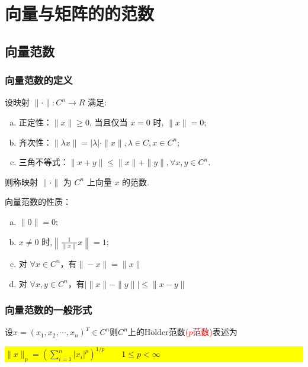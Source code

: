 \section{向量与矩阵的的范数}
\subsection{向量范数}
 \subsubsection{向量范数的定义}

\begin{definition}
设映射 \( \|\cdot\|: C^{n} \rightarrow R \) 满足:
\begin{enumerate}[(a)]
	\item 正定性：\( \|x\| \geq 0 \), 当且仅当 \( x=0 \) 时, \( \|x\|=0 \);
	\item 齐次性：\( \|\lambda x\|=|\lambda| \cdot\|x\|, \lambda \in C, x \in C^{n} \);
	\item 三角不等式：\( \|x+y\| \leq\|x\|+\|y\|, \forall x, y \in C^{n} \).
\end{enumerate}
	则称映射 \( \|\cdot\| \) 为 \( C^{n} \) 上向量 \( x \) 的范数.
\end{definition}

\noindent 向量范数的性质：
\begin{enumerate}[(a)]
	\item \( \|0\|=0 \);
	\item \( x \neq 0 \) 时,\( \left\|\frac{1}{\|x\|} x\right\|=1 \);
	\item 对 $\forall x \in C^n$，有$\|-x\|=\|x\|$
	\item 对 $\forall x, y \in C^n$，有$\left|\|x\|-\|y\| \right|  \leq \|x-y\|$
\end{enumerate}
 \subsubsection{向量范数的一般形式}


\begin{theorem}
	\label{ennnn}
设$x=(x_1,x_2,\cdots,x_n)^T\in C^n$则$C^n$上的$\mathrm{H\ddot{o}lder}$范数\textcolor{red}{($p$范数)}表述为

\colorbox{yellow}
{
	
$\| x\|_p=\left(\sum\limits_{i=1}^{n}|x_i|^p\right)^{1/p} \qquad 1\leq p<\infty $

}
\end{theorem}

